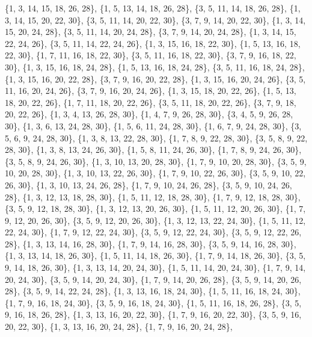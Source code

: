 \documentclass[11pt,a4paper]{article}
\begin{document}
{\{1, 3, 14, 15, 18, 26, 28\}, \{1, 5, 13, 14, 18, 26, 28\}, \{3, 5, 11, 14, 18, 26, 28\}, \{1, 3, 14, 15, 20, 22, 30\}, \{3, 5, 11, 14, 20, 22, 30\},
\{3, 7, 9, 14, 20, 22, 30\}, \{1, 3, 14, 15, 20, 24, 28\}, \{3, 5, 11, 14, 20, 24, 28\}, \{3, 7, 9, 14, 20, 24, 28\}, \{1, 3, 14, 15, 22, 24, 26\},
\{3, 5, 11, 14, 22, 24, 26\}, \{1, 3, 15, 16, 18, 22, 30\}, \{1, 5, 13, 16, 18, 22, 30\}, \{1, 7, 11, 16, 18, 22, 30\}, \{3, 5, 11, 16, 18, 22, 30\},
\{3, 7, 9, 16, 18, 22, 30\}, \{1, 3, 15, 16, 18, 24, 28\}, \{1, 5, 13, 16, 18, 24, 28\}, \{3, 5, 11, 16, 18, 24, 28\}, \{1, 3, 15, 16, 20, 22, 28\},
\{3, 7, 9, 16, 20, 22, 28\}, \{1, 3, 15, 16, 20, 24, 26\}, \{3, 5, 11, 16, 20, 24, 26\}, \{3, 7, 9, 16, 20, 24, 26\}, \{1, 3, 15, 18, 20, 22, 26\},
\{1, 5, 13, 18, 20, 22, 26\}, \{1, 7, 11, 18, 20, 22, 26\}, \{3, 5, 11, 18, 20, 22, 26\}, \{3, 7, 9, 18, 20, 22, 26\}, \{1, 3, 4, 13, 26, 28, 30\},
\{1, 4, 7, 9, 26, 28, 30\}, \{3, 4, 5, 9, 26, 28, 30\}, \{1, 3, 6, 13, 24, 28, 30\}, \{1, 5, 6, 11, 24, 28, 30\}, \{1, 6, 7, 9, 24, 28, 30\},
\{3, 5, 6, 9, 24, 28, 30\}, \{1, 3, 8, 13, 22, 28, 30\}, \{1, 7, 8, 9, 22, 28, 30\}, \{3, 5, 8, 9, 22, 28, 30\}, \{1, 3, 8, 13, 24, 26, 30\},
\{1, 5, 8, 11, 24, 26, 30\}, \{1, 7, 8, 9, 24, 26, 30\}, \{3, 5, 8, 9, 24, 26, 30\}, \{1, 3, 10, 13, 20, 28, 30\}, \{1, 7, 9, 10, 20, 28, 30\},
\{3, 5, 9, 10, 20, 28, 30\}, \{1, 3, 10, 13, 22, 26, 30\}, \{1, 7, 9, 10, 22, 26, 30\}, \{3, 5, 9, 10, 22, 26, 30\}, \{1, 3, 10, 13, 24, 26, 28\},
\{1, 7, 9, 10, 24, 26, 28\}, \{3, 5, 9, 10, 24, 26, 28\}, \{1, 3, 12, 13, 18, 28, 30\}, \{1, 5, 11, 12, 18, 28, 30\}, \{1, 7, 9, 12, 18, 28, 30\},
\{3, 5, 9, 12, 18, 28, 30\}, \{1, 3, 12, 13, 20, 26, 30\}, \{1, 5, 11, 12, 20, 26, 30\}, \{1, 7, 9, 12, 20, 26, 30\}, \{3, 5, 9, 12, 20, 26, 30\},
\{1, 3, 12, 13, 22, 24, 30\}, \{1, 5, 11, 12, 22, 24, 30\}, \{1, 7, 9, 12, 22, 24, 30\}, \{3, 5, 9, 12, 22, 24, 30\}, \{3, 5, 9, 12, 22, 26, 28\},
\{1, 3, 13, 14, 16, 28, 30\}, \{1, 7, 9, 14, 16, 28, 30\}, \{3, 5, 9, 14, 16, 28, 30\}, \{1, 3, 13, 14, 18, 26, 30\}, \{1, 5, 11, 14, 18, 26, 30\},
\{1, 7, 9, 14, 18, 26, 30\}, \{3, 5, 9, 14, 18, 26, 30\}, \{1, 3, 13, 14, 20, 24, 30\}, \{1, 5, 11, 14, 20, 24, 30\}, \{1, 7, 9, 14, 20, 24, 30\},
\{3, 5, 9, 14, 20, 24, 30\}, \{1, 7, 9, 14, 20, 26, 28\}, \{3, 5, 9, 14, 20, 26, 28\}, \{3, 5, 9, 14, 22, 24, 28\}, \{1, 3, 13, 16, 18, 24, 30\},
\{1, 5, 11, 16, 18, 24, 30\}, \{1, 7, 9, 16, 18, 24, 30\}, \{3, 5, 9, 16, 18, 24, 30\}, \{1, 5, 11, 16, 18, 26, 28\}, \{3, 5, 9, 16, 18, 26, 28\},
\{1, 3, 13, 16, 20, 22, 30\}, \{1, 7, 9, 16, 20, 22, 30\}, \{3, 5, 9, 16, 20, 22, 30\}, \{1, 3, 13, 16, 20, 24, 28\}, \{1, 7, 9, 16, 20, 24, 28\},
}
\end{document}
